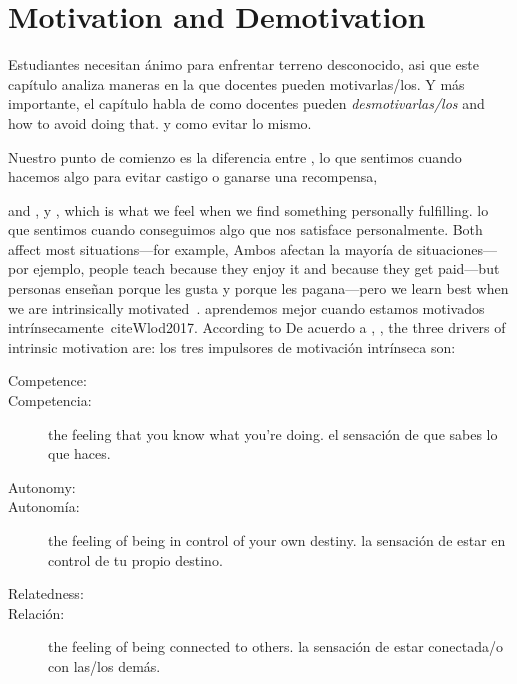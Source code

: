 \chapter{Motivation and Demotivation}\label{s:motivation}

Estudiantes necesitan ánimo para enfrentar terreno desconocido,
asi que este capítulo analiza maneras en la que docentes pueden motivarlas/los.
Y más importante,
el capítulo habla de como docentes pueden \emph{desmotivarlas/los}
and how to avoid doing that.
y como evitar lo mismo.

Nuestro punto de comienzo es la diferencia entre
,
lo que sentimos cuando hacemos algo para evitar castigo o ganarse una recompensa,

and ,
y ,
which is what we feel when we find something personally fulfilling.
lo que sentimos cuando conseguimos algo que nos satisface personalmente.
Both affect most situations---for example,
Ambos afectan la mayoría de situaciones---por ejemplo,
people teach because they enjoy it and because they get paid---but
personas enseñan porque les gusta y porque les pagana---pero
we learn best when we are intrinsically motivated~\cite{Wlod2017}.
aprendemos mejor cuando estamos motivados intrínsecamente~cite{Wlod2017}.
According to
De acuerdo a 
,
,
the three drivers of intrinsic motivation are:
los tres impulsores de motivación intrínseca son:

\begin{description}

\item[Competence:]
\item[Competencia:]
  the feeling that you know what you're doing.
  el sensación de que sabes lo que haces. 

\item[Autonomy:]
\item[Autonomía:]
  the feeling of being in control of your own destiny.
  la sensación de estar en control de tu propio destino.

\item[Relatedness:]
\item[Relación:]
  the feeling of being connected to others.
  la sensación de estar conectada/o con las/los demás.

\end{description}

